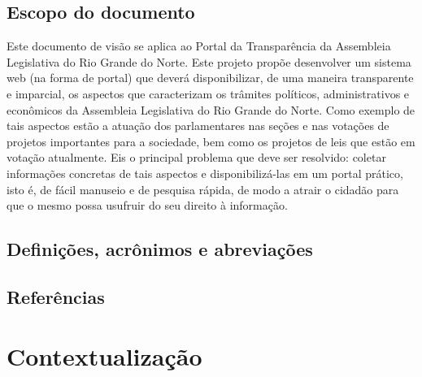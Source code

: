\documentclass[12pt, a4paper]{article}
\begin{document}
        \subsection{Escopo do documento}
        Este documento de visão se aplica ao Portal da Transparência da Assembleia
        Legislativa do Rio Grande do Norte. Este projeto propõe desenvolver um sistema
        web (na forma de portal) que deverá disponibilizar, de uma maneira transparente
        e imparcial, os aspectos que caracterizam os trâmites políticos,
        administrativos e econômicos da Assembleia Legislativa do Rio Grande do Norte.
        Como exemplo de tais aspectos estão a atuação dos parlamentares nas seções e
        nas votações de projetos importantes para a sociedade, bem como os projetos de
        leis que estão em votação atualmente. Eis o principal problema que deve ser
        resolvido: coletar informações concretas de tais aspectos e disponibilizá-las
        em um portal prático, isto é, de fácil manuseio e de pesquisa rápida, de modo a
        atrair o cidadão para que o mesmo possa usufruir do seu direito à informação.


        \subsection{Definições, acrônimos e abreviações}

        \subsection{Referências}

    \section{Contextualização}
\end{document}
